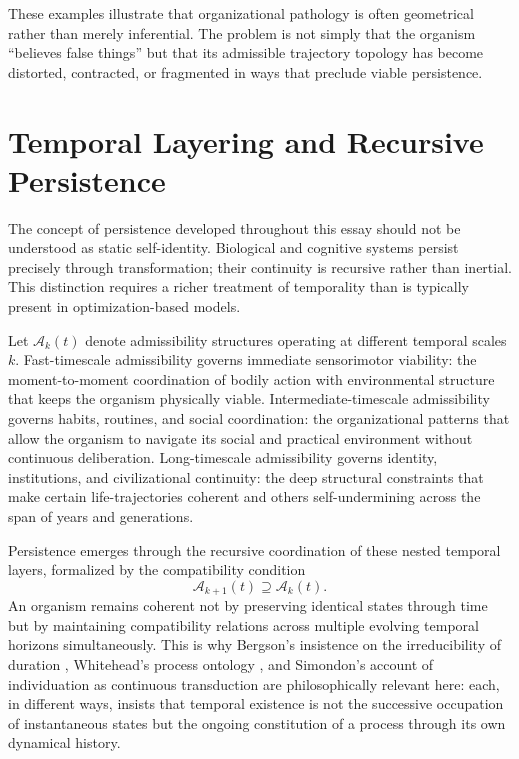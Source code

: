 \documentclass[12pt,a4paper]{report}
\theoremstyle{flyxion}
\begin{document}
These examples illustrate that organizational pathology is often geometrical rather than merely inferential. The problem is not simply that the organism ``believes false things'' but that its admissible trajectory topology has become distorted, contracted, or fragmented in ways that preclude viable persistence.

\section{Temporal Layering and Recursive Persistence}

The concept of persistence developed throughout this essay should not be understood as static self-identity. Biological and cognitive systems persist precisely through transformation; their continuity is recursive rather than inertial. This distinction requires a richer treatment of temporality than is typically present in optimization-based models.

Let $\mathcal{A}_k(t)$ denote admissibility structures operating at different temporal scales $k$. Fast-timescale admissibility governs immediate sensorimotor viability: the moment-to-moment coordination of bodily action with environmental structure that keeps the organism physically viable. Intermediate-timescale admissibility governs habits, routines, and social coordination: the organizational patterns that allow the organism to navigate its social and practical environment without continuous deliberation. Long-timescale admissibility governs identity, institutions, and civilizational continuity: the deep structural constraints that make certain life-trajectories coherent and others self-undermining across the span of years and generations.

Persistence emerges through the recursive coordination of these nested temporal layers, formalized by the compatibility condition
\[
\mathcal{A}_{k+1}(t) \supseteq \mathcal{A}_k(t).
\]
An organism remains coherent not by preserving identical states through time but by maintaining compatibility relations across multiple evolving temporal horizons simultaneously. This is why Bergson's insistence on the irreducibility of duration \cite{bergson}, Whitehead's process ontology \cite{whitehead}, and Simondon's account of individuation as continuous transduction \cite{simondon} are philosophically relevant here: each, in different ways, insists that temporal existence is not the successive occupation of instantaneous states but the ongoing constitution of a process through its own dynamical history.
\end{document}
